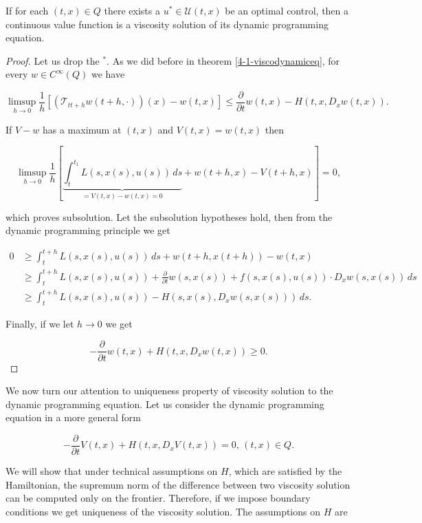 \begin{theorem}
    If for each $(t,x)\in Q$ there exists a $u^{\ast}\in\mathcal{U}(t,x)$ be an optimal control, then a continuous value function is a viscosity solution of its dynamic programming equation.
    
    \begin{proof}
        Let us drop the $^{\ast}$. As we did before in theorem \ref{4-1-viscodynamiceq}, for every $w\in C^{\infty}(Q)$ we have

        \[\limsup_{h\to0}\frac{1}{h}\left[(\mathcal{T}_{tt+h}w(t+h,\cdot))(x)-w(t,x)\right]\leq\frac{\partial}{\partial t}w(t,x) - H(t,x,D_xw(t,x)).\]

        If $V-w$ has a maximum at $(t,x)$ and $V(t,x)=w(t,x)$ then 

        \[\limsup_{h\to0}\frac{1}{h}\left[\underbrace{\int_t^{t_1} L(s,x(s),u(s))\,ds}_{=V(t,x)-w(t,x)=0} + w(t+h,x) - V(t+h,x)\right]=0,\]

        which proves subsolution. Let the subsolution hypotheses hold, then from the dynamic programming principle we get

        \begin{align*}
            0 & \geq \int_t^{t+h} L(s,x(s),u(s)) \,ds + w(t+h,x(t+h)) - w(t,x)\\ 
            & \geq  \int_t^{t+h} L(s,x(s),u(s)) + \frac{\partial}{\partial t}w(s,x(s)) + f(s,x(s),u(s))\cdot D_x w(s,x(s)) \,ds \\
            & \geq \int_t^{t+h} L(s,x(s),u(s)) - H(s,x(s),D_x w(s,x(s))) \,ds.
        \end{align*} 

        Finally, if we let $h\to0$ we get

        \[-\frac{\partial }{\partial t} w(t,x) + H(t,x,D_xw(t,x)) \geq 0.\]

    \end{proof}
\end{theorem}

We now turn our attention to uniqueness property of viscosity solution to the dynamic programming equation. Let us consider the dynamic programming equation 
in a more general form

\begin{equation}\label{4-2-firstordereq}
    -\frac{\partial}{\partial t}V(t,x) + H(t,x,D_xV(t,x)) = 0,\,(t,x)\in Q.
\end{equation}

We will show that under technical assumptions on $H$, which are satisfied by the Hamiltonian, the supremum norm of the difference between two viscosity solution 
can be computed only on the frontier. Therefore, if we impose boundary conditions we get uniqueness of the viscosity solution. 
The assumptions on $H$ are

